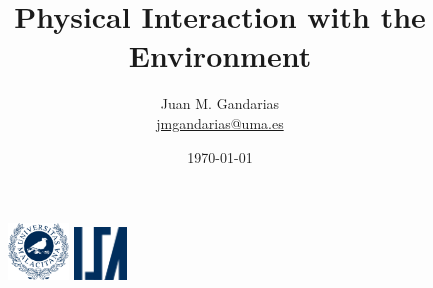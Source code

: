 \documentclass[10pt, aspectratio=169]{beamer}
\title[\href{https://jmgandarias.com}{\textcolor{white}{jmgandarias.com}}]{Physical Interaction with the Environment}
\theoremstyle{remark}
\theoremstyle{definition}
\begin{document}
\author[Systems Engineering and Automation]{
	\large
	Juan M. Gandarias\\
    \footnotesize \href{mailto:jmgandarias@uma.es}{jmgandarias@uma.es}
}



\date{\today}

\begin{noheadline}
\begin{frame}
    \maketitle
    \vspace{-1cm}
    \begin{figure}
		\centering
		\includegraphics[height=1.5cm]{./style_files_uma/logo_uma}
        \hspace{10cm}
        \includegraphics[height=1.4cm]{./style_files_uma/logo_isa}
	\end{figure}
 \end{frame}
\end{noheadline}
\end{document}
